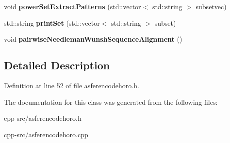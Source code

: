 \begin{DoxyCompactItemize}
\item 
\hypertarget{classasferencodehoro_a3faa4dcf9307c6dfa40f2615f1a5d18a}{void {\bfseries power\-Set\-Extract\-Patterns} (std\-::vector$<$ std\-::string $>$ subsetvec)}\label{classasferencodehoro_a3faa4dcf9307c6dfa40f2615f1a5d18a}

\item 
\hypertarget{classasferencodehoro_a8fcefb07716545d7f9d74744d2e21dec}{std\-::string {\bfseries print\-Set} (std\-::vector$<$ std\-::string $>$ subset)}\label{classasferencodehoro_a8fcefb07716545d7f9d74744d2e21dec}

\item 
\hypertarget{classasferencodehoro_a653d1b3bbce8d0508a739f9a98115b9b}{void {\bfseries pairwise\-Needleman\-Wunsh\-Sequence\-Alignment} ()}\label{classasferencodehoro_a653d1b3bbce8d0508a739f9a98115b9b}

\end{DoxyCompactItemize}


\subsection{Detailed Description}


Definition at line 52 of file asferencodehoro.\-h.



The documentation for this class was generated from the following files\-:\begin{DoxyCompactItemize}
\item 
cpp-\/src/asferencodehoro.\-h\item 
cpp-\/src/asferencodehoro.\-cpp\end{DoxyCompactItemize}
